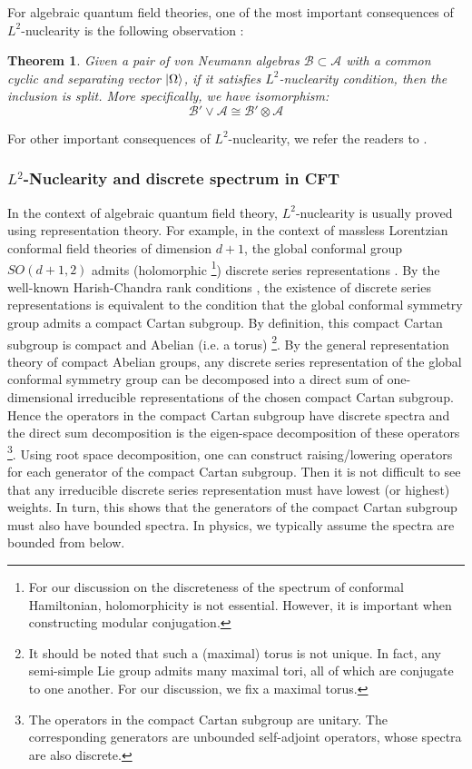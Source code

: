 \documentclass[a4paper,11pt]{article}
\newtheorem{theorem}{Theorem}
\theoremstyle{definition}
\begin{document}
For algebraic quantum field theories, one of the most important consequences of $L^2$-nuclearity is the following observation \cite{buchholz2007nuclearity}:
\begin{theorem}
    Given a pair of von Neumann algebras $\mathcal{B}\subset\mathcal{A}$ with a common cyclic and separating vector $\ket{\Omega}$, if it satisfies $L^2$-nuclearity condition, then the inclusion is split. More specifically, we have isomorphism:
    \begin{equation}
        \mathcal{B}'\vee\mathcal{A}\cong\mathcal{B}'\otimes\mathcal{A}
    \end{equation}
\end{theorem}
For other important consequences of $L^2$-nuclearity, we refer the readers to \cite{buchholz2007nuclearity}. 

\subsubsection{$L^2$-Nuclearity and discrete spectrum in CFT}\label{subsubsection:discrete}
In the context of algebraic quantum field theory, $L^2$-nuclearity is usually proved using representation theory. For example, in the context of massless Lorentzian conformal field theories of dimension $d + 1$, the global conformal group $SO(d + 1, 2)$ admits (holomorphic \footnote{For our discussion on the discreteness of the spectrum of conformal Hamiltonian, holomorphicity is not essential. However, it is important when constructing modular conjugation.})  discrete series representations \cite{knapp}. By the well-known Harish-Chandra rank conditions \cite{knapp}, the existence of discrete series representations is equivalent to the condition that the global conformal symmetry group admits a compact Cartan subgroup. By definition, this compact Cartan subgroup is compact and Abelian (i.e. a torus) \footnote{It should be noted that such a (maximal) torus is not unique. In fact, any semi-simple Lie group admits many maximal tori, all of which are conjugate to one another. For our discussion, we fix a maximal torus.}. By the general representation theory of compact Abelian groups, any discrete series representation of the global conformal symmetry group can be decomposed into a direct sum of one-dimensional irreducible representations of the chosen compact Cartan subgroup. Hence the operators in the compact Cartan subgroup have discrete spectra and the direct sum decomposition is the eigen-space decomposition of these operators \footnote{The operators in the compact Cartan subgroup are unitary. The corresponding generators are unbounded self-adjoint operators, whose spectra are also discrete.}. Using root space decomposition, one can construct raising/lowering operators for each generator of the compact Cartan subgroup. Then it is not difficult to see that any irreducible discrete series representation must have lowest (or highest) weights. In turn, this shows that the generators of the compact Cartan subgroup must also have bounded spectra. In physics, we typically assume the spectra are bounded from below.
\end{document}
